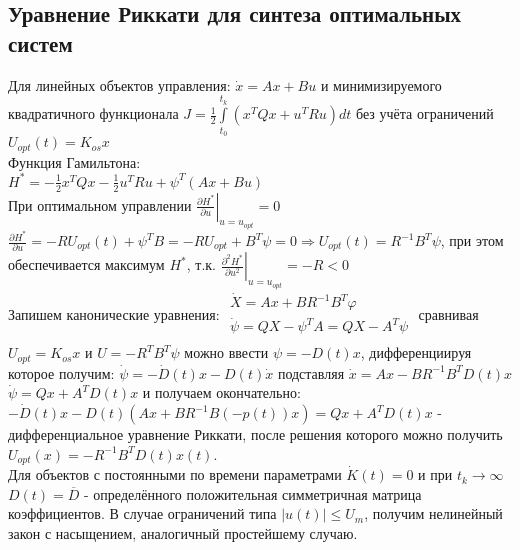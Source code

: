 \documentclass[preprint,russian,a5paper,10pt,twoside,mediummath]{ncc}
\begin{document}
	\subsection{Уравнение Риккати для синтеза оптимальных систем\label{maximum:Riccati}}
 \par Для линейных объектов управления: $\dot{x}=Ax+Bu$ и минимизируемого квадратичного функционала $J=\frac{1}{2}\int\limits_{{{t}_{0}}}^{{{t}_{k}}}{\left( {{x}^{T}}Qx+{{u}^{T}}Ru \right)dt}$ без учёта ограничений ${{U}_{opt}}\left( t \right)={{K}_{os}}x$ 
 \\Функция Гамильтона:
 \\${{H}^{*}}=-\frac{1}{2}{{x}^{T}}Qx-\frac{1}{2}{{u}^{T}}Ru+{{\psi }^{T}}\left( Ax+Bu \right)$
 \\При оптимальном управлении ${{\left. \frac{\partial {{H}^{*}}}{\partial u} \right|}_{u={{u}_{opt}}}}=0$ $\frac{\partial {{H}^{*}}}{\partial u}=-R{{U}_{opt}}\left( t \right)+{{\psi }^{T}}B=-R{{U}_{opt}}+{{B}^{T}}\psi =0\Rightarrow {{U}_{opt}}\left( t \right)={{R}^{-1}}{{B}^{T}}\psi $, при этом обеспечивается максимум ${{H}^{*}}$, т.к. ${{\left. \frac{{{\partial }^{2}}{{H}^{*}}}{\partial {{u}^{2}}} \right|}_{u={{u}_{opt}}}}=-R<0$
 \\Запишем канонические уравнения: $\begin{array}{*{35}{l}}
   \dot{X}=Ax+B{{R}^{-1}}{{B}^{T}}\varphi   \\
   \dot{\psi }=QX-{{\psi }^{T}}A=QX-{{A}^{T}}\psi   \\
\end{array}$ сравнивая ${{U}_{opt}}={{K}_{os}}x$ и $U=-{{R}^{T}}{{B}^{T}}\psi $ можно ввести $\psi =-D\left( t \right)x$, дифференциируя которое получим: $\dot{\psi }=-\dot{D}\left( t \right)x-D\left( t \right)\dot{x}$ подставляя $\dot{x}=Ax-B{{R}^{-1}}{{B}^{T}}D\left( t \right)x$ $\dot{\psi }=Qx+{{A}^{T}}D\left( t \right)x$ и получаем окончательно:
\\$-\dot{D}\left( t \right)x-D\left( t \right)\left( Ax+B{{R}^{-1}}B\left( -p\left( t \right) \right)x \right)=Qx+{{A}^{T}}D\left( t \right)x$ - дифференциальное уравнение Риккати, после решения которого можно получить ${{U}_{opt}}\left( x \right)=-{{R}^{-1}}{{B}^{T}}D\left( t \right)x\left( t \right)$.
\\Для объектов с постоянными по времени параметрами $\dot{K}\left( t \right)=0$ и при ${{t}_{k}}\to \infty $ $D\left( t \right)=\overline{D}$ - определённого положительная симметричная матрица коэффициентов. В случае ограничений типа $\left| u\left( t \right) \right|\le {{U}_{m}}$, получим нелинейный закон с насыщением, аналогичный простейшему случаю.
\end{document}
